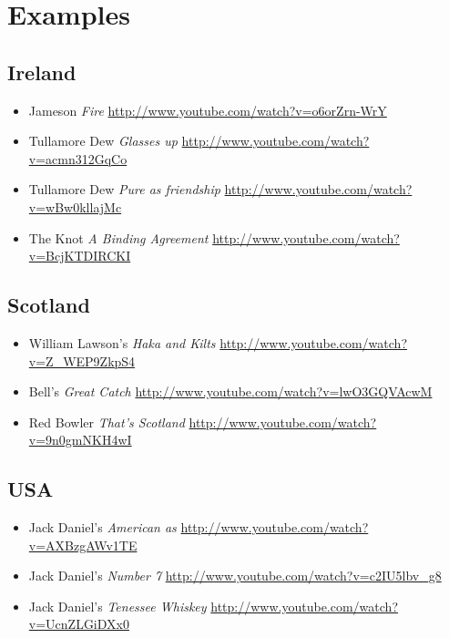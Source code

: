 \documentclass[12pt]{article}
\begin{document}
\section{Examples}

\subsection{Ireland}

 \begin{itemize}
  \item Jameson \emph{Fire} \url{http://www.youtube.com/watch?v=o6orZrn-WrY}
  \item Tullamore Dew \emph{Glasses up} \url{http://www.youtube.com/watch?v=acmn312GqCo}
  \item Tullamore Dew \emph{Pure as friendship} \url{http://www.youtube.com/watch?v=wBw0kllajMc}
  \item The Knot \emph{A Binding Agreement} \url{http://www.youtube.com/watch?v=BcjKTDIRCKI}
\end{itemize}

\subsection{Scotland}

\begin{itemize}
 \item William Lawson's \emph{Haka and Kilts} \url{http://www.youtube.com/watch?v=Z_WEP9ZkpS4}
 \item Bell's \emph{Great Catch} \url{http://www.youtube.com/watch?v=lwO3GQVAcwM}
 \item Red Bowler \emph{That's Scotland} \url{http://www.youtube.com/watch?v=9n0gmNKH4wI}
\end{itemize}

\subsection{USA}

\begin{itemize}
 \item Jack Daniel's \emph{American as} \url{http://www.youtube.com/watch?v=AXBzgAWv1TE}
 \item Jack Daniel's \emph{Number 7} \url{http://www.youtube.com/watch?v=c2IU5lbv_g8}
 \item Jack Daniel's \emph{Tenessee Whiskey} \url{http://www.youtube.com/watch?v=UcnZLGiDXx0}
\end{itemize}
\end{document}
